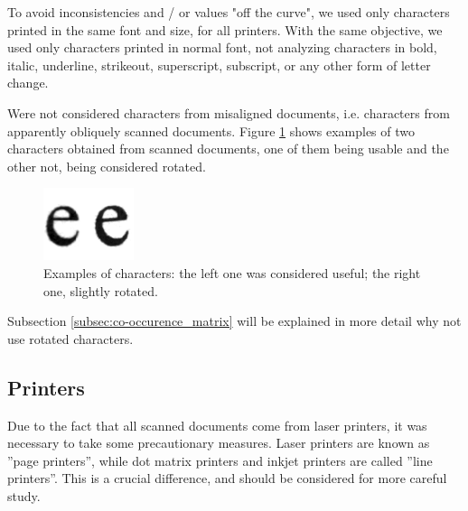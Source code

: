 \documentclass[10pt,twocolumn,letterpaper]{article}
\begin{document}
To avoid inconsistencies and / or values "off the curve", we used only characters printed in the same font and size, for all printers. With the same objective, we used only characters printed in normal font, not analyzing characters in bold, italic, underline, strikeout, superscript, subscript, or any other form of letter change.

Were not considered characters from misaligned documents, i.e. characters from apparently obliquely scanned documents. Figure \ref{fig:characters} shows examples of two characters obtained from scanned documents, one of them being usable and the other not, being considered rotated.

\begin{figure}
\begin{center}
	\includegraphics[width=0.99\columnwidth]{characters}
	\caption{Examples of characters: the left one was considered useful; the right one, slightly rotated.}
\label{fig:characters}   
\end{center} 
\end{figure}

Subsection \ref{subsec:co-occurence_matrix} will be explained in more detail why not use rotated characters.

\subsection{Printers}
\label{subsec:printers}

Due to the fact that all scanned documents come from laser printers, it was necessary to take some precautionary measures. Laser printers are known as ''page printers'', while dot matrix printers and inkjet printers are called ''line printers''. This is a crucial difference, and should be considered for more careful study. 
\end{document}
